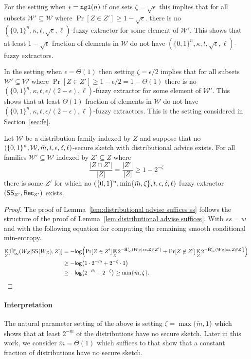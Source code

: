 For the setting when $\epsilon = \mathtt{ngl}(n)$  if one sets $\zeta = \sqrt{\epsilon}$ this implies that for all subsets $\mathcal{W}' \subseteq \mathcal{W}$ where $\Pr[Z\in Z']\ge 1-\sqrt{\epsilon}.$ there is no $(\{0,1\}^n,\kappa, t, \sqrt{\epsilon}, \ell)$-fuzzy extractor for some element of $\mathcal{W}'$.  This shows that at least $1-\sqrt{\epsilon}$ fraction of elements in $\mathcal{W}$ do not have $(\{0,1\}^n,\kappa, t, \sqrt{\epsilon}, \ell)$-fuzzy extractors.

In the setting when $\epsilon = \Theta(1)$ then setting $\zeta = \epsilon/2$ implies that for all subsets $\mathcal{W}' \subseteq \mathcal{W}$ where $\Pr[Z\in Z']\ge 1-\epsilon/2 = 1-\Theta(1)$ there is no $(\{0,1\}^n,\kappa, t, \epsilon/(2-\epsilon), \ell)$-fuzzy extractor for some element of $\mathcal{W}'$.  This shows that at least $\Theta(1)$ fraction of elements in $\mathcal{W}$ do not have $(\{0,1\}^n,\kappa, t, \epsilon/(2-\epsilon), \ell)$-fuzzy extractors. This is the setting considered in Section~\ref{sec:fe}.


\begin{lemma}
Let $\mathcal{W}$ be a distribution family indexed by $Z$ and suppose that no $(\{0, 1\}^n, \mathcal{W}, \tilde{m}, t, \epsilon, \delta, \ell)$-secure sketch with distributional advice exists.  For all families $\mathcal{W}'\subseteq \mathcal{W}$ indexed by $Z'\subseteq Z$ where\[\frac{|Z\cap Z'|}{|Z|} = \frac{|Z'|}{|Z|}\ge 1-2^{-\zeta}\]
there is some $Z'$ for which no  $(\{0, 1\}^n, \min\{\tilde{m}, \zeta\}, t, \epsilon, \delta, \ell)$ fuzzy extractor $({\mathsf{SS}}_{Z'}, {\mathsf{Rec}}_{Z'})$  exists.
\label{lem:distributional advise suffices ss}
\end{lemma}

\begin{proof}
The proof of Lemma~\ref{lem:distributional advise suffices ss} follows the structure of the proof of Lemma~\ref{lem:distributional advise suffices}.  With $ss=w$ and with the following equation for computing the remaining smooth conditional min-entropy.
\begin{align*}
\operatorname*{\mathbb{E}}_{Z} [\tilde{\mathrm{H}}_\infty^\epsilon(W_Z| {\mathsf{SS}}(W_Z), Z)] &= -\mathsf{log}\!\left(\Pr[Z\in Z']\operatorname*{\mathbb{E}}_{Z} 2^{-\tilde{\mathrm{H}}_\infty^\epsilon(W_Z| ss, Z\in Z')}+ \Pr[Z\not\in Z']\operatorname*{\mathbb{E}}_{Z} 2^{-\tilde{\mathrm{H}}_\infty^\epsilon(W_Z| ss, Z\not\in Z'] }\right)\\
&\ge -\mathsf{log}\!\left(1 \cdot 2^{-\tilde{m}}+ 2^{-\zeta}\cdot 1\right)\\
&\ge -\mathsf{log}\!\left(2^{-\tilde{m}}+2^{-\zeta}\right)  \ge \min\{\tilde{m},\zeta\}.
\end{align*}
\end{proof}

\paragraph{Interpretation}
The natural parameter setting of the above is setting $\zeta = \max\{\tilde{m},1\} $ which shows that at least $2^{-\tilde{m}}$ of the distributions have no secure sketch.  Later in this work, we consider $\tilde{m} = \Theta(1)$ which suffices to that show that a constant fraction of distributions have no secure sketch.




